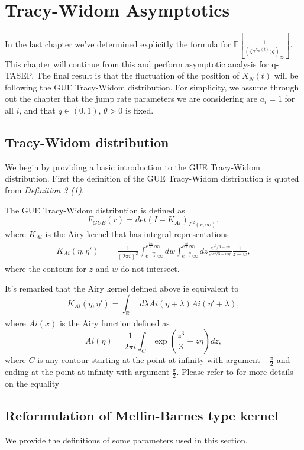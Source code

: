 \chapter{Tracy-Widom Asymptotics}
In the last chapter we've determined explicitly the formula for $\mathbb{E}\left[ \frac{1}{(\zeta q^{X_n(t)}; q)_{\infty}} \right]$. This chapter will continue from this and perform asymptotic analysis for q-TASEP. The final result is that the fluctuation of the position of $X_N(t)$ will be following the GUE Tracy-Widom distribution. For simplicity, we assume through out the chapter that the jump rate parameters we are considering are $a_i = 1$ for all $i$, and that $q \in (0,1)$, $\theta > 0$ is fixed. 

\section{Tracy-Widom distribution}
We begin by providing a basic introduction to the GUE Tracy-Widom distribution. First the definition of the GUE Tracy-Widom distribution is quoted from \cite{phase2015} \textit{Definition 3 (1)}.

\begin{definition}
The GUE Tracy-Widom distribution is defined as $$F_{GUE}(r) = det(I-K_{Ai})_{L^2(r, \infty)},$$ where $K_{Ai}$ is the Airy kernel that has integral representations 
\begin{align*}
K_{Ai}(\eta, \eta') &= \frac{1}{(2 \pi i)^2} \int_{e^{-\frac{2 \pi i}{3}} \infty}^{e^{\frac{2 \pi i}{3}} \infty} dw \int_{e^{-\frac{\pi i}{3}} \infty}^{e^{\frac{\pi i}{3}} \infty} dz \frac{e^{z^3 / 3 - z \eta}}{e^{w^3 / 3 - w \eta'}} \frac{1}{z-w},
\end{align*}
where the contours for $z$ and $w$ do not intersect. 
\end{definition}
\begin{remark}
It's remarked that the Airy kernel defined above ie equivalent to $$K_{Ai}(\eta, \eta') = \int_{\mathbb{R}_+} d\lambda Ai(\eta+\lambda) Ai(\eta' + \lambda),$$
where $Ai(x)$ is the Airy function defined as
$$Ai(\eta) = \frac{1}{2 \pi i} \int_{C} \exp (\frac{z^3}{3} - z \eta) dz,$$ where $C$ is any contour starting at the point at infinity with argument $-\frac{\pi}{2}$ and ending at the point at infinity with argument $\frac{\pi}{2}$. Please refer to \cite{airy-kernel} for more details on the equality
\end{remark}

\section{Reformulation of Mellin-Barnes type kernel}
\label{sec:reformulation-kernel}
We provide the definitions of some parameters used in this section.

